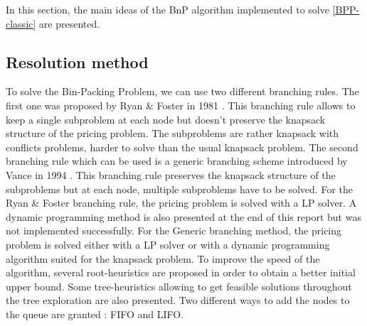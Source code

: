 In this section, the main ideas of the BnP algorithm implemented to solve \eqref{BPP-classic} are presented.

\subsection{Resolution method}

To solve the Bin-Packing Problem, we can use two different branching rules. The first one was proposed by Ryan \& Foster in 1981 \cite{ryan1981rn}. This branching rule allows to keep a single subproblem at each node but doesn't preserve the knapsack structure of the pricing problem. The subproblems are rather knapsack with conflicts problems, harder to solve than the usual knapsack problem. The second branching rule which can be used is a generic branching scheme introduced by Vance in 1994 \cite{vance1994solving}. This branching rule preserves the knapsack structure of the subproblems but at each node, multiple subproblems have to be solved. For the Ryan \& Foster branching rule, the pricing problem is solved with a LP solver. A dynamic programming method is also presented at the end of this report but was not implemented successfully. For the Generic branching method, the pricing problem is solved either with a LP solver or with a dynamic programming algorithm suited for the knapsack problem. To improve the speed of the algorithm, several root-heuristics are proposed in order to obtain a better initial upper bound. Some tree-heuristics allowing to get feasible solutions throughout the tree exploration are also presented. Two different ways to add the nodes to the queue are granted : FIFO and LIFO. 